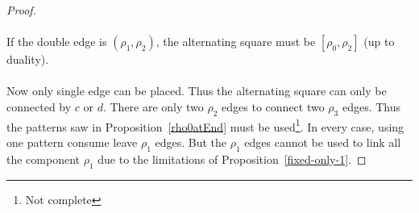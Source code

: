 \begin{proof}
  \paragraph{}
  If the double edge is $(\rho_1, \rho_2)$, the alternating square must be $[\rho_0, \rho_2]$ (up to duality).

  \begin{figure}[H]
    \begin{center}
      \caption{}
    \end{center}
  \end{figure}

  \paragraph{}
  Now only single edge can be placed. Thus the alternating square can only be connected by $c$ or $d$. There are only two $\rho_2$ edges to connect two $\rho_3$ edges. Thus the patterns saw in Proposition~\ref{rho0atEnd} must be used\footnote{Not complete}. In every case, using one pattern consume leave $\rho_1$ edges. But the $\rho_1$ edges cannot be used to link all the component $\rho_1$ due to the limitations of Proposition~\ref{fixed-only-1}.


\end{proof}
